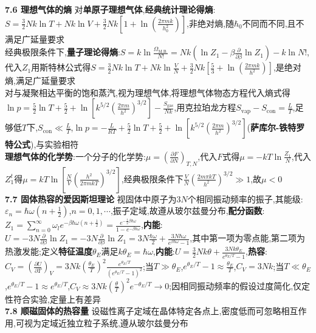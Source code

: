 \documentclass[10pt,a4paper]{article}
\begin{document}
\begin{multicols}{2}
\textbf{7.6 理想气体的熵}
对\textbf{单原子理想气体},\textbf{经典统计理论得熵}:$S=\frac{3}{2}Nk\ln T+Nk\ln V+\frac{3}{2}Nk\left[1+\ln\left(\frac{2\pi mk}{h_0^2}\right)\right]$,非绝对熵,随$\hbar_0$不同而不同,且不满足广延量要求\\
经典极限条件下,\textbf{量子理论得熵}:$S=k\ln\frac{\Omega_{\text{M.B.}}}{N!}=Nk(\ln Z_1-\beta\frac{\partial}{\partial\beta}\ln Z_1)-k\ln N!$,代入$Z_1$用斯特林公式得$S=\frac{3}{2}Nk\ln T+Nk\ln\frac{V}{N}+\frac{3}{2}Nk\left[\frac{5}{3}+\ln\left(\frac{2\pi mk}{h^2}\right)\right]$,是绝对熵,满足广延量要求\\
对与凝聚相达平衡的饱和蒸汽,视为理想气体,将理想气体物态方程代入熵式得$\ln p=\frac{5}{2}\ln T+\frac{5}{2}+\ln\left[k^{5/2}\left(\frac{2\pi m}{h^2}\right)^{3/2}\right]-\frac{S_{\text{gas}}}{Nk}$,用克拉珀龙方程$S_{\text{vap}}-S_{\text{con}}=\frac{L}{T}$,足够低$T$下,$S_{\text{con}}\ll\frac{L}{T}$,$\ln p=-\frac{L}{RT}+\frac{5}{2}\ln T+\frac{5}{2}+\ln\left[k^{5/2}\left(\frac{2\pi m}{h^2}\right)^{3/2}\right]$(\textbf{萨库尔-铁特罗特公式}),与实验相符\\
\textbf{理想气体的化学势}:一个分子的化学势:$\mu=\left(\frac{\partial F}{\partial N}\right)_{T,N}$,代入$F$式得$\mu=-kT\ln\frac{Z_1}{N}$,代入$Z_1^t$得$\mu=kT\ln\left[\frac{N}{V}\left(\frac{h^2}{2\pi mkT}\right)^{3/2}\right]$,经典极限条件下$\frac{V}{N}\left(\frac{2m\pi kT}{h^2}\right)^{3/2}\gg1$,故$\mu<0$\\
\textbf{7.7 固体热容的爱因斯坦理论}
视固体中原子为$3N$个相同振动频率的振子,其能级:$\varepsilon_n=\hbar\omega(n+\frac{1}{2})$,$n=0,1,\cdots$,振子定域,故遵从玻尔兹曼分布,\textbf{配分函数}:$Z_1=\sum_{n=0}^{\infty}\omega_le^{-\beta\hbar\omega(n+\frac{1}{2})}=\frac{e^{-\frac{1}{2}\beta\hbar\omega}}{1-e^{-\beta\hbar\omega}}$,\textbf{内能}:$U=-3N\frac{\partial}{\partial\beta}\ln Z_1=-3N\frac{\partial}{\partial\beta}\ln Z_1=3N\frac{\hbar\omega}{2}+\frac{3N\hbar\omega}{e^{\beta\hbar\omega}-1}$,其中第一项为零点能,第二项为热激发能;定义\textbf{特征温度$\theta_{E}$}满足$k\theta_E=\hbar\omega$,\textbf{内能}:$U=\frac{3}{2}Nk\theta+\frac{3Nk\theta_E}{e^{\theta_E/T}-1}$,\textbf{热容}:$C_V=\left(\frac{\partial U}{\partial T}\right)_V=3Nk\left(\frac{\theta_E}{T}\right)^2\frac{e^{\theta_E/T}}{(e^{\theta_E/T}-1)^2}$;当$T\gg\theta_E$,$e^{\theta_E/T}-1\approx\frac{\theta_E}{T}$,$C_V=3Nk$;当$T\ll\theta_E$,$e^{\theta_E/T}-1\approx e^{\theta_E/T}$,$C_V\approx3Nk\left(\frac{\theta}{T}\right)^2e^{-\theta_E/T}\rightarrow0$;因相同振动频率的假设过度简化,仅定性符合实验,定量上有差异\\
\textbf{7.8 顺磁固体的热容量}
设磁性离子定域在晶体特定各点上,密度低而可忽略相互作用,可视为定域近独立粒子系统,遵从玻尔兹曼分布\\

\end{multicols}
\end{document}
